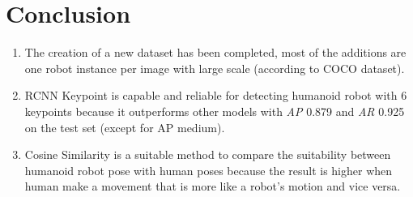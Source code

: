 \section{Conclusion}
\label{sec:conclusion}


\begin{enumerate}

      \item The creation of a new dataset has been completed,
            most of the additions are one robot instance per image with large scale (according to COCO dataset).
      \item RCNN Keypoint is capable and reliable for detecting humanoid robot with 6 keypoints because it outperforms other models with \emph{AP} 0.879 and \emph{AR} 0.925 on the test set (except for AP medium).
      \item Cosine Similarity is a suitable method to compare the suitability between humanoid robot pose with human poses because the result is higher when
            human make a movement that is more like a robot's motion and vice versa.
\end{enumerate}